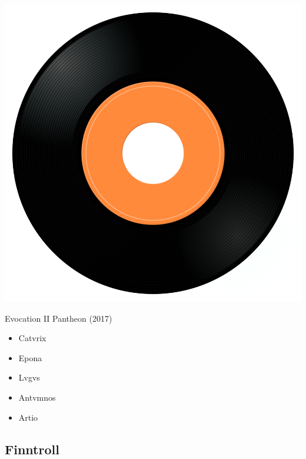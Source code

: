 \begin{minipage}[t]{0.25\textwidth}
\captionsetup{type=figure}
\includegraphics[width=\textwidth]{Images/cover.png}
\caption*{Evocation II Pantheon (2017)}
\end{minipage}
\begin{minipage}[t]{0.25\textwidth}\vspace{0pt}
\begin{itemize}[nosep,leftmargin=1em,labelwidth=*,align=left]
	\setlength{\itemsep}{0pt}
	\item Catvrix
	\item Epona
	\item Lvgvs
	\item Antvmnos
	\item Artio
\end{itemize}
\end{minipage}

\subsection{Finntroll}

